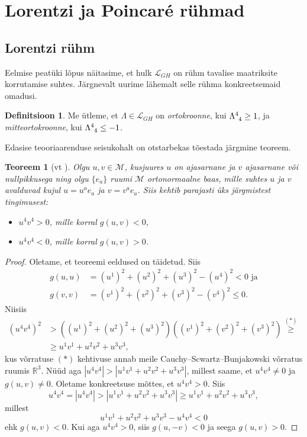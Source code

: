 \documentclass[12pt,a4paper,oneside]{article}
\theoremstyle{plain}
\newtheorem{teoreem}{Teoreem}[section]
\theoremstyle{definition}
\newtheorem{definitsioon}{Definitsioon}[section]
\numberwithin{equation}{section}
\def\R{{\mathbb R}}
\def\L{{\mathcal L}}
\def\M{{\mathcal M}}
\begin{document}
\newpage
\section{Lorentzi ja Poincar\'e rühmad}

\subsection{Lorentzi rühm}

Eelmise peatüki lõpus näitasime, et hulk $\L_{GH}$ on rühm 
tavalise maatriksite korrutamise suhtes. Järgnevalt uurime 
lähemalt selle rühma konkreetsemaid omadusi.

\begin{definitsioon}
Me ütleme, et $\Lambda \in \L_{GH}$ on \emph{ortokroonne}, kui 
$\Lambda\indices{^4_4} \geq 1$, ja \emph{mitteortokroonne}, kui 
$\Lambda\indices{^4_4} \leq -1$.
\end{definitsioon}

Edasise teooriaarenduse seisukohalt on otstarbekas tõestada järgmine 
teoreem.
\begin{teoreem} [vt \textnormal{\cite[teoreem 1.3.1]{Naber}}] 
\label{teoreem:ajasarnased_vektorid}
Olgu $u, v \in \M$, kusjuures $u$ on ajasarnane ja $v$ ajasarnane 
või nullpikkusega ning olgu $\{e_a\}$ ruumi $\M$ ortonormaalne baas, 
mille suhtes $u$ ja $v$ avalduvad kujul $u = u^a e_a$ ja 
$v = v^a e_a$. Siis kehtib parajasti üks järgmistest tingimusest:
\begin{itemize}
\item[\emph{(a)}] $u^4 v^4 > 0$, mille korral $g\left(u, v\right) < 0$,
\item[\emph{(b)}] $u^4 v^4 < 0$, mille korral $g\left(u, v\right) > 0$.
\end{itemize}
\end{teoreem}
\begin{proof}
Oletame, et teoreemi eeldused on täidetud. Siis
\begin{align*}
g \left(u, u\right) &= \left(u^1\right)^2 + \left(u^2\right)^2 + 
	\left(u^3\right)^2 - \left(u^4\right)^2 < 0 \text{ ja} \\
g \left(v, v\right) &= \left(v^1\right)^2 + \left(v^2\right)^2 + 
	\left(v^3\right)^2 - \left(v^4\right)^2 \leq 0.
\end{align*}
Niisiis
\begin{align*}
\left(u^4 v^4\right)^2 &> \left( \left(u^1\right)^2 + 
\left(u^2\right)^2 + \left(u^3\right)^2 \right) 
\left( \left(v^1\right)^2 + \left(v^2\right)^2 + 
\left(v^3\right)^2 \right) \overset{(*)}{\geq} \\
&\geq u^1 v^1 + u^2 v^2 + u^3 v^3,
\end{align*}
kus võrratuse $(*)$ kehtivuse annab meile Cauchy--Scwartz--Bunjakowski võrratus 
ruumis $\R^3$.
Nüüd aga $|u^4 v^4| > |u^1 v^1 + u^2 v^2 + u^3 v^3|$, millest saame, 
et $u^4 v^4 \neq 0$ ja $g\left (u, v\right ) \neq 0$.
Oletame konkreetsuse mõttes, et $u^4 v^4 > 0$. Siis
\[u^4 v^4 = |u^4 v^4| > |u^1 v^1 + u^2 v^2 + u^3 v^3| 
\geq u^1 v^1 + u^2 v^2 + u^3 v^3,\]
millest
\[u^1 v^1 + u^2 v^2 + u^3 v^3 - u^4 v^4 < 0\]
ehk $g\left (u, v\right ) < 0$.
Kui aga $u^4 v^4 > 0$, siis $g\left (u, -v\right ) < 0$ ja seega 
$g \left (u, v\right ) > 0$.
\end{proof}
\end{document}
